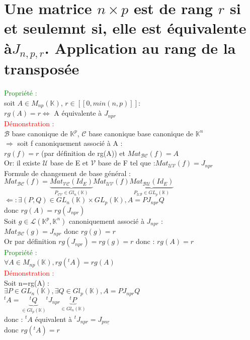 \documentclass{article}
\begin{document}
        \section{Une matrice $n \times p$ est de rang $r$ si et seulemnt si, elle est équivalente à$J_{n,p,r}$. Application au rang de la transposée}
				\textcolor{green}{Propriété : } \\
				soit $A \in M_{np}(\mathbb K)$, $r \in [[0,min(n,p)]]$: \\
				$rg(A)=r \Longleftrightarrow$ A équivalente à $J_{npr}$ \\
				\textcolor{red}{Démonstration :} \\
				$\mathcal B$ base canonique de $\mathbb K^p$, $\mathcal C$ base canonique base canonique de $\mathbb K^n$ \\
				$\Rightarrow$ soit f canoniquement associé à A : \\
				$rg(f)=r$ (par définition de rg(A)) et $Mat_{\mathcal{BC}}(f)=A$ \\
				Or: il existe $\mathcal U$ base de E et $\mathcal V$ base de F tel que :$Mat_{\mathcal{UV}}(f)=J_{npr}$ \\
				Formule de changement de base général : \\
				$Mat_{\mathcal{BC}}(f)=\underbrace{Mat_{\mathcal{VC}}(Id_E)}_{P_{\mathcal{CV}} \in Gl_n(\mathbb K) } Mat_{\mathcal{UV}}(f) \underbrace{Mat_{\mathcal{BU}}(Id_E)}_{P_{\mathcal{UB}} \in GL_p(\mathbb K)}$ \\
				$\Leftarrow : \exists (P,Q) \in GL_n(\mathbb K) \times GL_p(\mathbb K), A=PJ_{npr}Q$ \\
				donc $rg(A)=rg(J_{npr})$ \\
				Soit $g \in \mathcal L(\mathbb K^p, \mathbb K^n)$ canoniquement associé à $J_{npr}$ : \\
				$Mat_{\mathcal{BC}}(g)=J_{npr}$ donc $rg(g)=r$ \\
				Or par définition $rg(J_{npr})=rg(g)=r$ donc : $rg(A)=r$ \\
				\textcolor{green}{Propriété :} \\
				$\forall A \in M_{np}(\mathbb K), rg({}^tA)=rg(A)$ \\
				\textcolor{red}{Démonstration :} \\
				Soit n=rg(A) : \\
				$\exists P \in GL_n(\mathbb K), \exists Q \in Gl_p(\mathbb K),A=PJ_{npr}Q$ \\
				${}^t A = \underbrace{^t Q}_{\in Gl_p (\mathbb K)} {}^t J_{npr} \underbrace{^t P}_{\in Gl_n(\mathbb K)}$ \\
				donc : ${}^t A$ équivalent à ${}^t J_{npr}= J_{pn \underline{r}}$ \\
				donc $rg({}^t A)=r$
\end{document}
